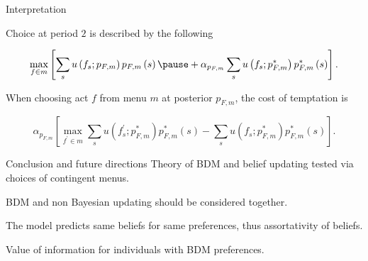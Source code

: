\documentclass[usenames,dvipsnames,aspectratio=169,11pt, envcountsect]{beamer}
\begin{document}
\begin{frame}{Interpretation}

	Choice at period \( 2 \) is described by the following

	\vfill


	\[
		\max _{f \in m} \left[\sum_{s} u \left( f_{s} ; p_{F,m} \right) p_{F,m} \left( s \right) \pause + \alpha _{p_{F,m}} \sum_{s} u \left( f_{s} ; p^{*}_{F,m} \right) p^{*}_{F,m} \left( s \right)  \right].
	\]

	\vfill \pause


	When choosing act \( f \) from menu \( m \) at posterior \( p_{F,m} \), the cost of temptation is

	\vfill

	\[
		\alpha_{p_{F,m}} \left[ \max _{f^{\prime} \in m} \sum_{s} u\left(f^{\prime}_{s} ; p^{*}_{F,m} \right) p^{*}_{F,m} \left( s \right) - \sum_{s} u \left( f_{s} ; p^{*}_{F,m} \right) p^{*}_{F,m} \left( s \right) \right] .
	\]

\end{frame}

\begin{frame}{Conclusion and future directions}
	Theory of BDM and belief updating tested via choices of contingent menus.

	\vfill

	BDM and non Bayesian updating should be considered together.

	\vfill

	The model predicts same beliefs for same preferences, thus assortativity of beliefs.

	\vfill

	Value of information for individuals with BDM preferences.

\end{frame}
\end{document}
